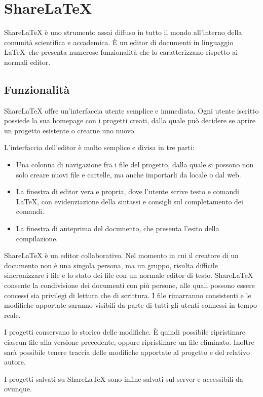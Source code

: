 \chapter{ShareLaTeX}
\label{ShareLaTeX}
\thispagestyle{empty}

ShareLaTeX è uno strumento assai diffuso in tutto il mondo all'interno della comunità scientifica e accademica. È un editor di documenti in linguaggio \LaTeX ~che presenta numerose funzionalità che lo caratterizzano rispetto ai normali editor.

\section{Funzionalità}
ShareLaTeX offre un'interfaccia utente semplice e immediata. Ogni utente iscritto possiede la sua homepage con i progetti creati, dalla quale può decidere se aprire un progetto esistente o crearne uno nuovo.

L'interfaccia dell'editor è molto semplice e divisa in tre parti:
\begin{itemize}
    \item Una colonna di navigazione fra i file del progetto, dalla quale si possono non solo creare nuovi file e cartelle, ma anche importarli da locale o dal web.
    \item La finestra di editor vera e propria, dove l'utente scrive testo e comandi \LaTeX, con evidenziazione della sintassi e consigli sul completamento dei comandi.
    \item La finestra di anteprima del documento, che presenta l'esito della compilazione.
\end{itemize}
ShareLaTeX è un editor collaborativo. Nel momento in cui il creatore di un documento non è una singola persona, ma un gruppo, risulta difficile sincronizzare i file e lo stato dei file con un normale editor di testo. ShareLaTeX consente la condivisione dei documenti con più persone, alle quali possono essere concessi sia privilegi di lettura che di scrittura. I file rimarranno consistenti e le modifiche apportate saranno visibili da parte di tutti gli utenti connessi in tempo reale.

I progetti conservano lo storico delle modifiche. È quindi possibile ripristinare ciascun file alla versione precedente, oppure ripristinare un file eliminato. Inoltre sarà possibile tenere traccia delle modifiche apportate al progetto e del relativo autore.

I progetti salvati su ShareLaTeX sono infine salvati sul server e accessibili da ovunque.

